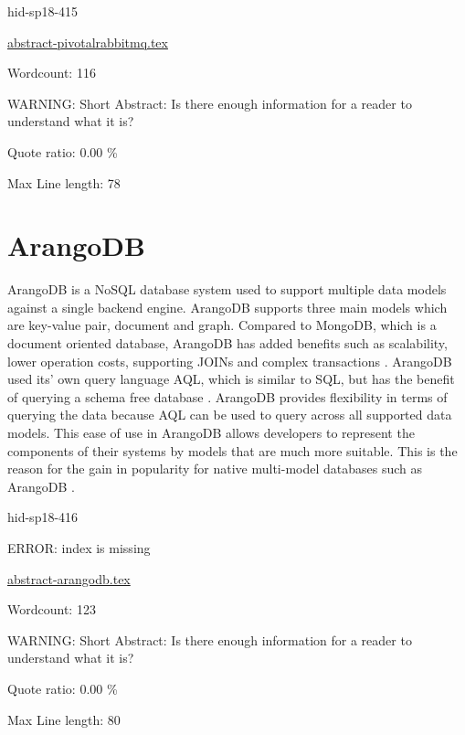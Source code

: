 \begin{IU}

hid-sp18-415

\href{https://github.com/cloudmesh-community/hid-sp18-415/blob/master//technology/abstract-pivotalrabbitmq.tex}{abstract-pivotalrabbitmq.tex}

 

Wordcount: 116

WARNING: Short Abstract: Is there enough information for a reader to understand what it is?


Quote ratio: 0.00 \%
 
Max Line length: 78
\end{IU}

\section{ArangoDB}

ArangoDB is a NoSQL database system used to support multiple data models against
a single backend engine. ArangoDB supports three main models which are key-value
pair, document and graph. Compared to MongoDB, which is a document oriented
database, ArangoDB has added benefits such as scalability, lower operation
costs, supporting JOINs and complex transactions
\cite{hid-sp18-416-www-arangodb}. ArangoDB used its’ own query language AQL,
which is similar to SQL,
but has the benefit of querying a schema free database
\cite{hid-sp18-416-www-aql-blog}. ArangoDB provides flexibility in terms of
querying the data because
AQL can be used to query across all supported data models. This ease of use in
ArangoDB allows developers to represent the components of their systems by
models that are much more suitable. This is the reason for the gain in
popularity for native multi-model databases such as ArangoDB
\cite{hid-sp18-416-www-graphdb-blog}.

\begin{IU}

hid-sp18-416

ERROR: index is missing

\href{https://github.com/cloudmesh-community/hid-sp18-416/blob/master//technology/abstract-arangodb.tex}{abstract-arangodb.tex}

 

Wordcount: 123

WARNING: Short Abstract: Is there enough information for a reader to understand what it is?


Quote ratio: 0.00 \%
 
Max Line length: 80
\end{IU}

